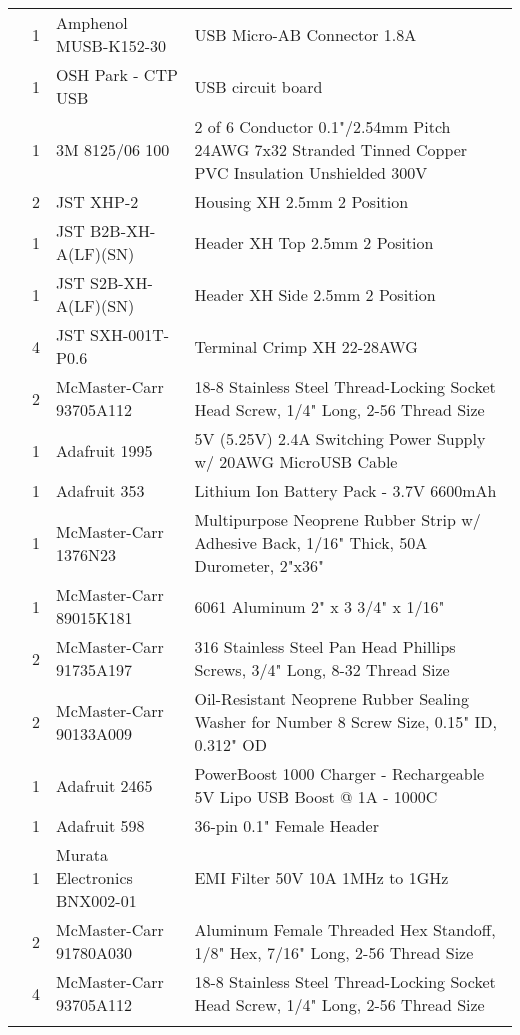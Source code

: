 \begin{longtabu}{X[3,c,m] X[1,c,m] X[3,c,m] X[5,l,m]}
   & 1 & Amphenol MUSB-K152-30 & USB Micro-AB Connector 1.8A \\
  & 1 & OSH Park - CTP USB & USB circuit board \\
  & 1 & 3M 8125/06 100 & 2 of 6 Conductor 0.1"/2.54mm Pitch 24AWG 7x32 Stranded Tinned Copper PVC Insulation Unshielded 300V \\
  & 2 & JST XHP-2 & Housing XH 2.5mm 2 Position \\
  & 1 & JST B2B-XH-A(LF)(SN) & Header XH Top 2.5mm 2 Position \\
  & 1 & JST S2B-XH-A(LF)(SN) & Header XH Side 2.5mm 2 Position \\
  & 4 & JST SXH-001T-P0.6 & Terminal Crimp XH 22-28AWG \\
  & 2 & McMaster-Carr 93705A112 & 18-8 Stainless Steel Thread-Locking Socket Head Screw, 1/4" Long, 2-56 Thread Size \\ \mrule

   & 1 & Adafruit 1995 & 5V (5.25V) 2.4A Switching Power Supply w/ 20AWG MicroUSB Cable \\ \mrule

   & 1 & Adafruit 353 & Lithium Ion Battery Pack - 3.7V 6600mAh \\
  & 1 & McMaster-Carr 1376N23 & Multipurpose Neoprene Rubber Strip w/ Adhesive Back, 1/16" Thick, 50A Durometer, 2"x36" \\
  & 1 & McMaster-Carr 89015K181 & 6061 Aluminum 2" x 3 3/4" x 1/16" \\
  & 2 & McMaster-Carr 91735A197 & 316 Stainless Steel Pan Head Phillips Screws, 3/4" Long, 8-32 Thread Size \\
  & 2 & McMaster-Carr 90133A009 & Oil-Resistant Neoprene Rubber Sealing Washer for Number 8 Screw Size, 0.15" ID, 0.312" OD \\ \mrule

   & 1 & Adafruit 2465 & PowerBoost 1000 Charger - Rechargeable 5V Lipo USB Boost @ 1A - 1000C \\
  & 1 & Adafruit 598 & 36-pin 0.1" Female Header \\
  & 1 & Murata Electronics BNX002-01 & EMI Filter 50V 10A 1MHz to 1GHz \\
  & 2 & McMaster-Carr 91780A030 & Aluminum Female Threaded Hex Standoff, 1/8" Hex, 7/16" Long, 2-56 Thread Size \\
  & 4 & McMaster-Carr 93705A112 & 18-8 Stainless Steel Thread-Locking Socket Head Screw, 1/4" Long, 2-56 Thread Size \\ \mrule


\end{longtabu}
